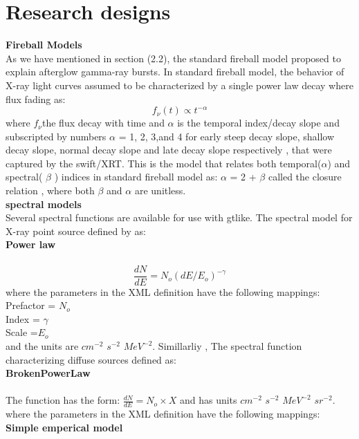 \section{Research designs}
\textbf{Fireball Models}\\
As we have mentioned in section (2.2), the  standard fireball model proposed to explain afterglow gamma-ray bursts. In standard fireball model, the behavior of X-ray light curves  assumed to be characterized by a single power law decay where flux fading  as: 
\begin{equation}
f_{\nu}(t)\propto  t^{-\alpha} 
\end{equation}
where  $f_{\nu} $the flux decay with time and  $ \alpha  $ is the temporal index/decay slope and subscripted by numbers  $ \alpha $ = 1, 2, 3,and 4 for early steep decay slope, shallow decay slope, normal decay slope and late decay slope respectively , that were captured by the swift/XRT. This  is the model that relates both temporal($ \alpha $) and spectral( $ \beta $ ) indices  in standard fireball model as:
 $\alpha$ = 2 + $\beta$  called the closure relation , where   both  $\beta $  and  $ \alpha $   are  unitless.\\
 \textbf{spectral models}\\
 Several spectral functions are available for use with gtlike. The spectral model for X-ray point source  defined by as:\\ 
\textbf{Power law}\\\\
\begin{equation}
\frac{dN}{dE} = N_{o} (dE/ E_{o})^{-\gamma}
\end{equation}
where the parameters in the XML definition have the following mappings:\\
Prefactor = $N_{o}$\\
Index = $\gamma$\\
Scale =$E_{o}$\\
and the units are $ cm^{-2} $ $s^{-2}$ $ MeV^{-2} $. Simillarliy , The spectral function characterizing  diffuse sources defined as:\\
\textbf{BrokenPowerLaw }\\\\
The function has the form:
$\frac{dN}{dE}= N_{o}\times X$
and has units $ cm^{-2} $ $s^{-2}$ $ MeV^{-2} $ $ sr^{-2} $.\\
where the parameters in the XML definition have the following mappings:\\
\textbf{Simple emperical model }\\\\
 
